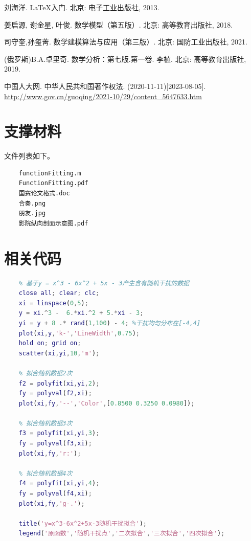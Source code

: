 \documentclass{my_cumcmthesis}
\begin{document}
\begin{thebibliography}{9}
    刘海洋.
    \newblock \LaTeX {}入门\allowbreak[M].
    \newblock 北京: 电子工业出版社, 2013.

    姜启源, 谢金星, 叶俊.
    \newblock 数学模型（第五版）\allowbreak[M].
    \newblock 北京: 高等教育出版社, 2018.

    司守奎,孙玺菁.
    \newblock 数学建模算法与应用（第三版）\allowbreak[M].
    \newblock 北京: 国防工业出版社, 2021.

    (俄罗斯)B.A.卓里奇.
    \newblock 数学分析：第七版.第一卷\allowbreak[M].
    \newblock 李植. 北京: 高等教育出版社, 2019.

    中国人大网.
    \newblock 中华人民共和国著作权法\allowbreak[EB/OL].
    \newblock (2020-11-11)[2023-08-05].
    \newblock \url{http://www.gov.cn/guoqing/2021-10/29/content_5647633.htm}
\end{thebibliography}
\newpage

\begin{appendix}
\section{支撑材料}
    文件列表如下。
\begin{lstlisting}
    functionFitting.m
    FunctionFitting.pdf
    国赛论文格式.doc
    合奏.png
    朋友.jpg
    影院纵向剖面示意图.pdf
\end{lstlisting}

\section{相关代码}
\begin{lstlisting}[language=matlab]
    % functionFitting.m
    % 基于y = x^3 - 6x^2 + 5x - 3产生含有随机干扰的数据
    close all; clear; clc;
    xi = linspace(0,5);
    y = xi.^3 -  6.*xi.^2 + 5.*xi - 3;
    yi = y + 8 .* rand(1,100) - 4; %干扰均匀分布在[-4,4]
    plot(xi,y,'k-','LineWidth',0.75);
    hold on; grid on;
    scatter(xi,yi,10,'m');
    
    % 拟合随机数据2次
    f2 = polyfit(xi,yi,2);
    fy = polyval(f2,xi);
    plot(xi,fy,'--','Color',[0.8500 0.3250 0.0980]);
    
    % 拟合随机数据3次
    f3 = polyfit(xi,yi,3);
    fy = polyval(f3,xi);
    plot(xi,fy,'r:');
    
    % 拟合随机数据4次
    f4 = polyfit(xi,yi,4);
    fy = polyval(f4,xi);
    plot(xi,fy,'g-.');
    
    title('y=x^3-6x^2+5x-3随机干扰拟合');
    legend('原函数','随机干扰点','二次拟合','三次拟合','四次拟合');
\end{lstlisting}
\end{appendix}
\end{document}

